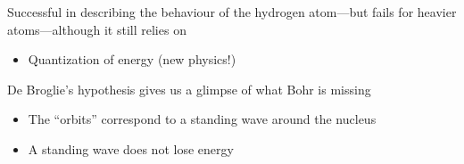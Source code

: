 \documentclass[11pt]{article}
\begin{document}
%
%
%
Successful in describing the behaviour of the hydrogen atom---but fails for
heavier atoms---although it still relies on 
\begin{itemize}[noitemsep,topsep=0pt]
\item Quantization of energy (new physics!)
\end{itemize}
De Broglie's hypothesis gives us a glimpse of what Bohr is missing
\begin{itemize}[noitemsep,topsep=0pt]
\item The ``orbits'' correspond to a standing wave around the nucleus
\item A standing wave does not lose energy
\end{itemize}
\end{document}
